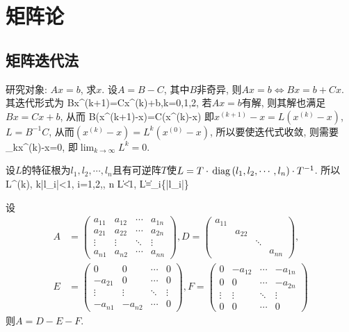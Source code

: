 \chapter{矩阵论}
\section{矩阵迭代法}
研究对象: $Ax=b$, 求$x$. 设$A=B-C$, 其中$B$非奇异, 则$Ax=b\Longleftrightarrow Bx=b+Cx$. 其迭代形式为
\bee
Bx^{(k+1)}=Cx^{(k)}+b,\quad k=0,1,2,\cdots
\eee
若$Ax=b$有解, 则其解也满足$Bx=Cx+b$, 从而
\bee
B(x^{(k+1)}-x)=C(x^{(k)}-x)
\eee
即$x^{(k+1)}-x=L(x^{(k)}-x)$, $L=B^{-1}C$, 从而$(x^{(k)}-x)=L^k(x^{(0)}-x)$, 所以要使迭代式收敛, 则需要
\bee
\lim_{k\to\infty}x^{(k)}-x=0,
\eee
即$\lim_{k\to\infty}L^k=0$.

设$L$的特征根为$l_1, l_2, \cdots, l_n$且有可逆阵$T$使$L=T \cdot \,\mathrm{diag}\,(l_1, l_2, \cdots, l_n) \cdot T^{-1}$. 所以
\bee
L^{(k)}, k\to\infty \Longleftrightarrow |l_i|<1, i=1,2,\cdots, n \Longleftrightarrow \|L\|<1, \|L\|=\max_i\{|l_i|\}
\eee

设
\begin{align*}
A & =
\begin{pmatrix}
  a_{11} & a_{12} & \cdots & a_{1n} \\
  a_{21} & a_{22} & \cdots & a_{2n} \\
  \vdots  & \vdots  & \ddots & \vdots  \\
  a_{n1} & a_{n2} & \cdots & a_{nn} 
\end{pmatrix},
D =
\begin{pmatrix}
 a_{11} & & & \\
  & a_{22} & & \\
  & & \ddots & \\
  & & & a_{nn}
\end{pmatrix},\\
E & =
\begin{pmatrix}
  0 & 0 & \cdots & 0\\
  -a_{21} & 0 & \cdots & 0\\
  \vdots & \vdots & \ddots & \vdots \\
  -a_{n1} & -a_{n2} & \cdots & 0
\end{pmatrix},
F=
\begin{pmatrix}
 0 & -a_{12} & \cdots & -a_{1n}\\
 0 & 0 & \cdots & -a_{2n}\\
 \vdots & \vdots & \ddots & \vdots \\
 0 & 0 & \cdots & 0
\end{pmatrix}
\end{align*}
则$A=D-E-F$.

